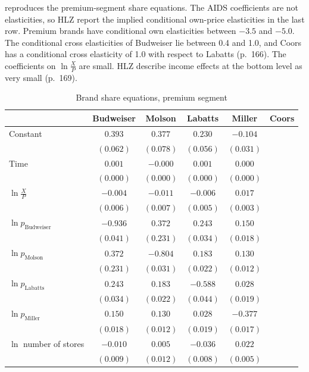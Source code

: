  reproduces the premium-segment share equations. The AIDS coefficients are not
elasticities, so HLZ report the implied conditional own-price elasticities in the last row. Premium brands have
conditional own elasticities between $-3.5$ and $-5.0$. The conditional cross elasticities of Budweiser lie
between 0.4 and 1.0, and Coors has a conditional cross elasticity of 1.0 with respect to Labatts (p.~166). The
coefficients on $\ln\frac{X}{P}$ are small. HLZ describe income effects at the bottom level as very small
(p.~169).

\begin{table}[htbp]
\centering
\caption{Brand share equations, premium segment}\label{tab:05-hlz-table2}
\begin{threeparttable}
\begin{tabular}{@{}lccccc@{}}
\toprule
 & Budweiser & Molson & Labatts & Miller & Coors \\
\midrule
Constant & $0.393$ & $0.377$ & $0.230$ & $-0.104$ & \\
 & $(0.062)$ & $(0.078)$ & $(0.056)$ & $(0.031)$ & \\
Time & $0.001$ & $-0.000$ & $0.001$ & $0.000$ & \\
 & $(0.000)$ & $(0.000)$ & $(0.000)$ & $(0.000)$ & \\
$\ln\frac{X}{P}$ & $-0.004$ & $-0.011$ & $-0.006$ & $0.017$ & \\
 & $(0.006)$ & $(0.007)$ & $(0.005)$ & $(0.003)$ & \\
$\ln p_{\text{Budweiser}}$ & $-0.936$ & $0.372$ & $0.243$ & $0.150$ & \\
 & $(0.041)$ & $(0.231)$ & $(0.034)$ & $(0.018)$ & \\
$\ln p_{\text{Molson}}$ & $0.372$ & $-0.804$ & $0.183$ & $0.130$ & \\
 & $(0.231)$ & $(0.031)$ & $(0.022)$ & $(0.012)$ & \\
$\ln p_{\text{Labatts}}$ & $0.243$ & $0.183$ & $-0.588$ & $0.028$ & \\
 & $(0.034)$ & $(0.022)$ & $(0.044)$ & $(0.019)$ & \\
$\ln p_{\text{Miller}}$ & $0.150$ & $0.130$ & $0.028$ & $-0.377$ & \\
 & $(0.018)$ & $(0.012)$ & $(0.019)$ & $(0.017)$ & \\
$\ln$ number of stores & $-0.010$ & $0.005$ & $-0.036$ & $0.022$ & \\
 & $(0.009)$ & $(0.012)$ & $(0.008)$ & $(0.005)$ & \\

\end{tabular}
\end{threeparttable}
\end{table}
